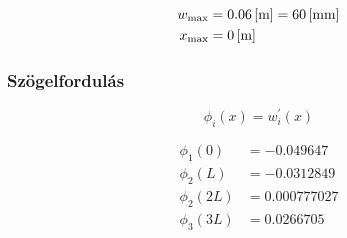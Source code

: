\begin{align*}
	w_{\text{max}} &= \m{0.06} = \mm{60} \\
	x_{\text{max}} &= \m{0}
\end{align*}

\subsubsection{Szögelfordulás}

\begin{equation*}
	\phi_i(x) = w_i^{'}(x)
\end{equation*}

\begin{align*}
	\phi_1(0) &= -0.049647 \\
	\phi_2(L) &= -0.0312849 \\
	\phi_2(2L) &= 0.000777027 \\
	\phi_3(3L) &= 0.0266705
\end{align*}
